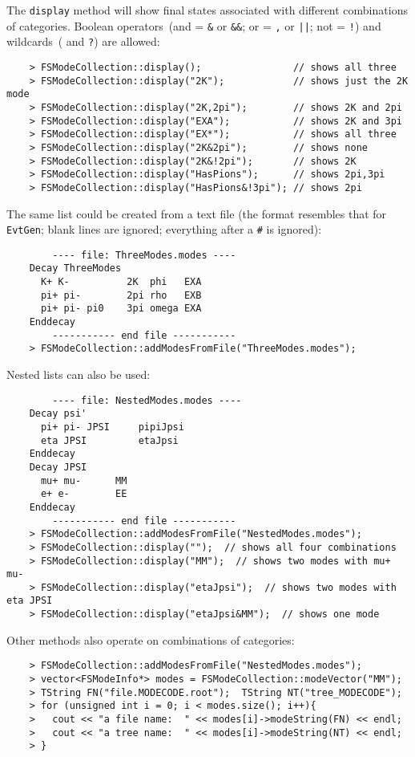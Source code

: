 \documentclass[11pt]{article}
\begin{document}
The {\tt display} method will show final states associated with different combinations of categories.  Boolean operators~(and = {\tt\&} or {\tt\&\&}; or = {\tt,} or {\tt||}; not = {\tt!}) and wildcards~({\tt*} and {\tt?}) are allowed:
\begin{verbatim}
    > FSModeCollection::display();                // shows all three
    > FSModeCollection::display("2K");            // shows just the 2K mode
    > FSModeCollection::display("2K,2pi");        // shows 2K and 2pi
    > FSModeCollection::display("EXA");           // shows 2K and 3pi
    > FSModeCollection::display("EX*");           // shows all three
    > FSModeCollection::display("2K&2pi");        // shows none
    > FSModeCollection::display("2K&!2pi");       // shows 2K
    > FSModeCollection::display("HasPions");      // shows 2pi,3pi
    > FSModeCollection::display("HasPions&!3pi"); // shows 2pi
\end{verbatim}

The same list could be created from a text file (the format resembles that for {\tt EvtGen}; blank lines are ignored; everything after a {\tt \#} is ignored):
\begin{verbatim}
        ---- file: ThreeModes.modes ----
    Decay ThreeModes
      K+ K-          2K  phi   EXA
      pi+ pi-        2pi rho   EXB
      pi+ pi- pi0    3pi omega EXA
    Enddecay
        ----------- end file -----------
    > FSModeCollection::addModesFromFile("ThreeModes.modes");
\end{verbatim}
Nested lists can also be used:
\begin{verbatim}
        ---- file: NestedModes.modes ----
    Decay psi'
      pi+ pi- JPSI     pipiJpsi
      eta JPSI         etaJpsi
    Enddecay
    Decay JPSI
      mu+ mu-      MM
      e+ e-        EE
    Enddecay
        ----------- end file -----------
    > FSModeCollection::addModesFromFile("NestedModes.modes");
    > FSModeCollection::display("");  // shows all four combinations 
    > FSModeCollection::display("MM");  // shows two modes with mu+ mu- 
    > FSModeCollection::display("etaJpsi");  // shows two modes with eta JPSI 
    > FSModeCollection::display("etaJpsi&MM");  // shows one mode 
\end{verbatim}

Other methods also operate on combinations of categories:
\begin{verbatim}
    > FSModeCollection::addModesFromFile("NestedModes.modes");
    > vector<FSModeInfo*> modes = FSModeCollection::modeVector("MM");
    > TString FN("file.MODECODE.root");  TString NT("tree_MODECODE");
    > for (unsigned int i = 0; i < modes.size(); i++){ 
    >   cout << "a file name:  " << modes[i]->modeString(FN) << endl;
    >   cout << "a tree name:  " << modes[i]->modeString(NT) << endl;
    > }
\end{verbatim}
\end{document}

